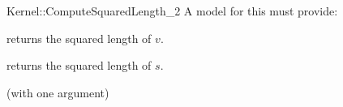 \begin{ccRefFunctionObjectConcept}{Kernel::ComputeSquaredLength_2}
A model for this must provide:


       {returns the squared length of $v$. }

       {returns the squared length of $s$. }

\ccRefines
{} (with one argument)

\ccSeeAlso
{} \\
 \\

\end{ccRefFunctionObjectConcept}
